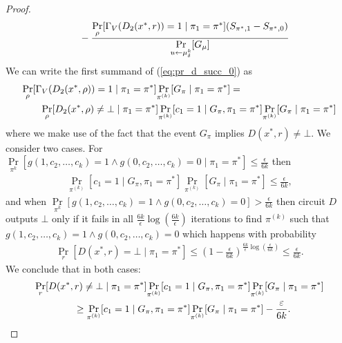 \begin{proof}
\begin{align}
  & \mbox\qquad - \frac{\underset{\rho}{\Pr}[\Gamma_V(D_2(x^*, r)) = 1 \mid \pi_1 = \pi^*](S_{\pi^*,1} - S_{\pi^*,0})}{\underset{u \leftarrow \mu_{\delta}^{k}}{\Pr}[G_{\mu}]}
\end{align}
%
We can write the first summand of (\ref{eq:pr_d_succ_0}) as
\begin{align}
  &\underset{\rho}{\Pr}[\Gamma_V(D_2(x^*,\rho)) = 1 \mid \pi_1 = \pi^*] \underset{\pi^{(k)}}{\Pr}[G_{\pi} \mid \pi_1 = \pi^*] = \notag\\
  &\mbox\qquad \underset{\rho}{\Pr}[D_2(x^*,\rho) \neq \bot \mid \pi_1 = \pi^*]
  \underset{\pi^{(k)}}{\Pr}[c_1 = 1 \mid G_{\pi}, \pi_1 = \pi^*]
  \underset{\pi^{(k)}}{\Pr}[G_{\pi} \mid \pi_1 = \pi^*]
\end{align}
where we make use of the fact that the event $G_{\pi}$ implies $D(x^*, r) \neq \bot$.
We consider two cases.
For $\underset{\pi^{k}}{\Pr}[g(1, c_2, \dots, c_k) = 1 \land g(0, c_2, \dots,c_k ) = 0 \mid \pi_1 = \pi^*] \leq \frac{\epsilon}{6k}$ then
\begin{align}
  \underset{\pi^{(k)}}{\Pr}[c_1 = 1 \mid G_{\pi}, \pi_1 = \pi^*] \underset{\pi^{(k)}}{\Pr}[G_{\pi} \mid \pi_1 = \pi^*] \leq \frac{\epsilon}{6k},
\end{align}
and when $\underset{\pi^{k}}{\Pr}[g(1, c_2, \dots, c_k) = 1 \land g(0, c_2, \dots,c_k ) = 0] > \frac{\epsilon}{6k}$ then circuit $D$ outputs $\bot$
only if it fails in all $\frac{6k}{\epsilon} \log(\frac{6k}{\epsilon})$ iterations to find $\pi^{(k)}$ such that $g(1, c_2, \dots, c_k) = 1 \land g(0, c_2, \dots, c_k) = 0$
which happens with probability
\begin{align}
\underset{r}{\Pr}[D(x^*,r) = \bot \mid \pi_1 = \pi^*] \leq (1 - \frac{\epsilon}{6k})^{\frac{6k}{\epsilon}\log(\frac{\epsilon}{6k})} \leq \frac{\epsilon}{6k}.
\end{align}
We conclude that in both cases:
\begin{align}
  &\underset{r}{\Pr}[D(x^*,r) \neq \bot \mid \pi_1 = \pi^*]
  \underset{\pi^{(k)}}{\Pr}[c_1 = 1 \mid G_{\pi}, \pi_1 = \pi^*]
  \underset{\pi^{(k)}}{\Pr}[G_{\pi} \mid \pi_1 = \pi^*] \notag\\
  &\IndII \geq \underset{\pi^{(k)}}{\Pr}[c_1 = 1 \mid G_{\pi}, \pi_1 = \pi^*]\underset{\pi^{(k)}}{\Pr}[G_{\pi} \mid \pi_1 = \pi^*] - \frac{\epsilon}{6k}.

\end{align}
\end{proof}
